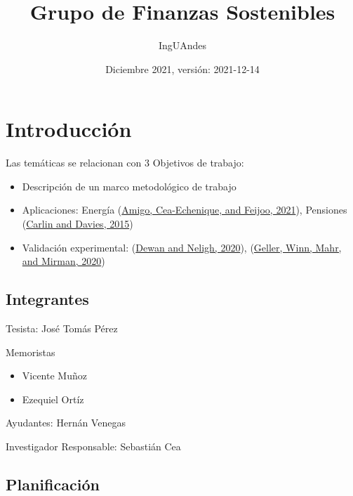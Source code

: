 \documentclass[
]{book}
\title{Grupo de Finanzas Sostenibles}
\author{IngUAndes}
\date{Diciembre 2021, versión: 2021-12-14}
\providecommand{\tightlist}{%
  \setlength{\itemsep}{0pt}\setlength{\parskip}{0pt}}
\begin{document}
\maketitle

{
\setcounter{tocdepth}{1}
\tableofcontents
}
\hypertarget{introducciuxf3n}{%
\chapter*{Introducción}\label{introducciuxf3n}}

Las temáticas se relacionan con 3 Objetivos de trabajo:

\begin{itemize}
\tightlist
\item
  Descripción de un marco metodológico de trabajo
\item
  Aplicaciones: Energía (\protect\hyperlink{bib-amigo_two_2021}{Amigo, Cea-Echenique, and Feijoo, 2021}), Pensiones (\protect\hyperlink{bib-carlin_implementation_2015}{Carlin and Davies, 2015})
\item
  Validación experimental: (\protect\hyperlink{bib-dewan_estimating_2020}{Dewan and Neligh, 2020}), (\protect\hyperlink{bib-geller_gazer_2020}{Geller, Winn, Mahr, and Mirman, 2020})
\end{itemize}

\hypertarget{integrantes}{%
\section*{Integrantes}\label{integrantes}}

Tesista: José Tomás Pérez

Memoristas

\begin{itemize}
\tightlist
\item
  Vicente Muñoz
\item
  Ezequiel Ortíz
\end{itemize}

Ayudantes: Hernán Venegas

Investigador Responsable: Sebastián Cea

\hypertarget{planificaciuxf3n}{%
\section*{Planificación}\label{planificaciuxf3n}}
\end{document}
